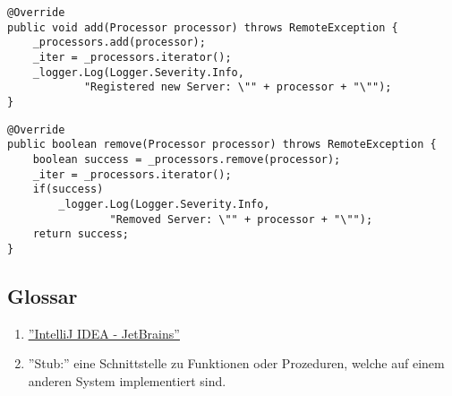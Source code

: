 \begin{lstlisting}[style=Java, caption=Proxy Implementation - Proxy::add]
@Override
public void add(Processor processor) throws RemoteException {
    _processors.add(processor);
    _iter = _processors.iterator();
    _logger.Log(Logger.Severity.Info,
            "Registered new Server: \"" + processor + "\"");
}
\end{lstlisting}

\begin{lstlisting}[style=Java, caption=Proxy Implementation - Proxy::remove]
@Override
public boolean remove(Processor processor) throws RemoteException {
    boolean success = _processors.remove(processor);
    _iter = _processors.iterator();
    if(success)
        _logger.Log(Logger.Severity.Info,
                "Removed Server: \"" + processor + "\"");
    return success;
}
\end{lstlisting}
\subsection{Glossar}
\begin{enumerate}
    \item \href{https://www.jetbrains.com/idea}{\color{blue}\underline{''IntelliJ IDEA - JetBrains''}}
    \item ''Stub:'' eine Schnittstelle zu Funktionen oder Prozeduren, welche auf einem anderen System implementiert sind.
\end{enumerate}


